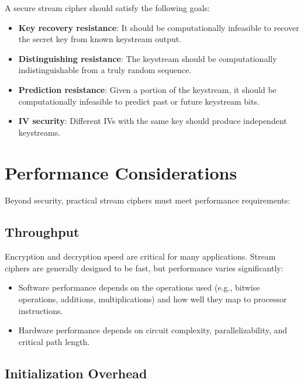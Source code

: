 \documentclass[12pt,a4paper,oneside]{report}
\begin{document}
A secure stream cipher should satisfy the following goals:

\begin{itemize}
    \item \textbf{Key recovery resistance}: It should be computationally infeasible to recover the secret key from known keystream output.
    
    \item \textbf{Distinguishing resistance}: The keystream should be computationally indistinguishable from a truly random sequence.
    
    \item \textbf{Prediction resistance}: Given a portion of the keystream, it should be computationally infeasible to predict past or future keystream bits.
    
    \item \textbf{IV security}: Different IVs with the same key should produce independent keystreams.
\end{itemize}

\section{Performance Considerations}
\label{sec:performance}

Beyond security, practical stream ciphers must meet performance requirements:

\subsection{Throughput}

Encryption and decryption speed are critical for many applications. Stream ciphers are generally designed to be fast, but performance varies significantly:

\begin{itemize}
    \item Software performance depends on the operations used (e.g., bitwise operations, additions, multiplications) and how well they map to processor instructions.
    
    \item Hardware performance depends on circuit complexity, parallelizability, and critical path length.
\end{itemize}

\subsection{Initialization Overhead}
\end{document}
